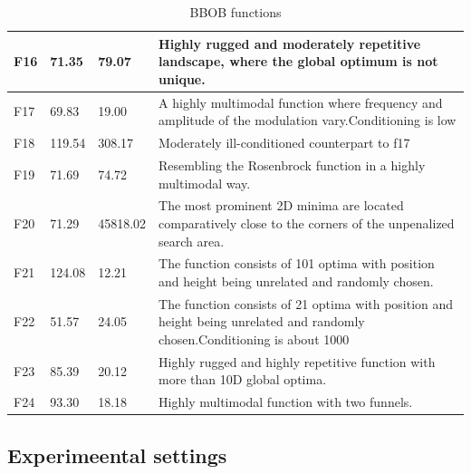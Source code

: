 \documentclass{article}
\begin{document}
\begin{table}[H]
{\begin{tabular}{|l|l|l|l|}
        F16 & 71.35 & 79.07 & Highly rugged and moderately repetitive landscape, where the global optimum is not unique. \\ \hline
        F17 & 69.83 & 19.00  & A highly multimodal function where frequency and amplitude of the modulation vary.Conditioning is low \\ \hline
        F18 & 119.54 & 308.17 & Moderately ill-conditioned counterpart to f17 \\ \hline
        F19 & 71.69 & 74.72 & Resembling the Rosenbrock function in a highly multimodal way. \\ \hline
        F20 & 71.29 & 45818.02 & The most prominent 2D minima are located comparatively close to the corners of the unpenalized search area. \\ \hline
        F21 & 124.08 & 12.21 & The function consists of 101 optima with position and height being unrelated and randomly chosen. \\ \hline
        F22 & 51.57 & 24.05 & The function consists of 21 optima with position and height being unrelated and randomly chosen.Conditioning is about 1000 \\ \hline
        F23 & 85.39 & 20.12 & Highly rugged and highly repetitive function with more than 10D global optima. \\ \hline
        F24 & 93.30  & 18.18 &  Highly multimodal function with two funnels. \\ \hline
    \end{tabular}
    }
    \caption{BBOB functions}
\end{table}

\subsection{Experimeental settings}
\end{document}
